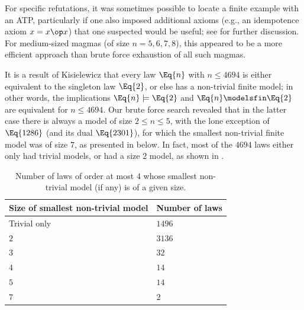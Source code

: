 For specific refutations, it was sometimes possible to locate a finite example with an ATP, particularly if one also imposed additional axioms (e.g., an idempotence axiom $x = x \op x$) that one suspected would be useful; see  for further discussion.  For medium-sized magmas (of size $n=5,6,7,8$), this appeared to be a more efficient approach than brute force exhaustion of all such magmas.

It is a result of Kisielewicz \cite{Kisielewicz} that every law $\Eq{n}$ with $n \leq 4694$ is either equivalent to the singleton law $\Eq{2}$, or else has a non-trivial finite model; in other words, the implications $\Eq{n} \models \Eq{2}$ and $\Eq{n} \modelsfin \Eq{2}$ are equivalent for $n \leq 4694$.  Our brute force search revealed that in the latter case there is always a model of size $2 \leq n \leq 5$, with the lone exception of $\Eq{1286}$ (and its dual $\Eq{2301}$), for which the smallest non-trivial finite model was of size $7$, as presented in  below.  In fact, most of the $\num{4694}$ laws either only had trivial models, or had a size $2$ model, as shown in .
\begin{table}
\centering
\caption{Number of laws of order at most $4$ whose smallest non-trivial model (if any) is of a given size.}\label{size-table}
\begin{tabular}{ll}
  \hline
Size of smallest non-trivial model & Number of laws \\
\hline
Trivial only & $1496$ \\
$2$ & $3136$ \\
$3$ & $32$ \\
$4$ & $14$ \\
$5$ & $14$ \\
$7$ & $2$\\
\hline
\end{tabular}
\end{table}

